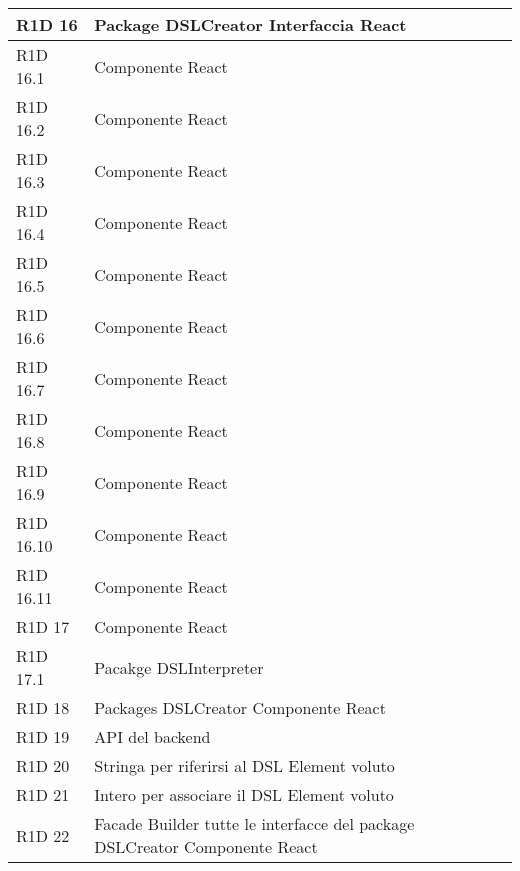 \begin{center}
\begin{longtable}{ | l | p{8cm} |}
	R1D 16 & Package DSLCreator \newline Interfaccia React \\ \hline

	R1D 16.1 & Componente React \\ \hline

	R1D 16.2 & Componente React \\ \hline

	R1D 16.3 & Componente React \\ \hline	

	R1D 16.4 & Componente React \\ \hline

	R1D 16.5 & Componente React \\ \hline

	R1D 16.6 & Componente React \\ \hline

	R1D 16.7 & Componente React \\ \hline

	R1D 16.8 & Componente React \\ \hline

	R1D 16.9 & Componente React \\ \hline

	R1D 16.10 & Componente React \\ \hline

	R1D 16.11 & Componente React \\ \hline

	R1D 17 & Componente React \\ \hline 

	R1D 17.1 & Pacakge DSLInterpreter \\ \hline

	R1D 18 & Packages DSLCreator \newline Componente React \\ \hline

	R1D 19 & API del backend \\ \hline

	R1D 20 & Stringa per riferirsi al DSL Element voluto \\ \hline
 
	R1D 21 & Intero per associare il DSL Element voluto \\ \hline

	R1D 22 & Facade \newline Builder \newline tutte le interfacce del package DSLCreator \newline Componente React \\ \hline


\end{longtable}
\end{center}
